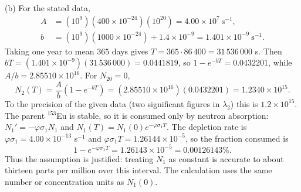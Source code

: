 (b) For the stated data,
\begin{align*}
A&=(10^9)(400\times10^{-24})(10^{20})
=4.00\times10^7\ \mathrm{s}^{-1},\\
b&=(10^9)(1000\times10^{-24})+1.4\times10^{-9}
=1.401\times10^{-9}\ \mathrm{s}^{-1}.
\end{align*}
Taking one year to mean $365$ days gives
$T=365\cdot86\,400=31\,536\,000$ s. Then
$bT=(1.401\times10^{-9})(31\,536\,000)=0.0441819$, so
$1-e^{-bT}=0.0432201$, while $A/b=2.85510\times10^{16}$.
For $N_{20}=0$,
\[
N_2(T)=\frac Ab\left(1-e^{-bT}\right)
=(2.85510\times10^{16})(0.0432201)
=\boxed{1.2340\times10^{15}}.
\]
To the precision of the given data (two significant figures
in $\lambda_2$) this is $1.2\times10^{15}$.
The parent ${}^{153}$Eu is stable, so it is consumed only by
neutron absorption: $N_1'=-\varphi\sigma_1N_1$ and
$N_1(T)=N_1(0)e^{-\varphi\sigma_1T}$. The depletion rate is
$\varphi\sigma_1=4.00\times10^{-13}$ s$^{-1}$ and
$\varphi\sigma_1T=1.26144\times10^{-5}$, so the fraction consumed is
\[
1-e^{-\varphi\sigma_1T}=1.26143\times10^{-5}
=0.00126143\%.
\]
Thus the assumption is justified: treating $N_1$ as constant
is accurate to about thirteen parts per million over this
interval. The calculation uses
the same number or concentration units as $N_1(0)$.

